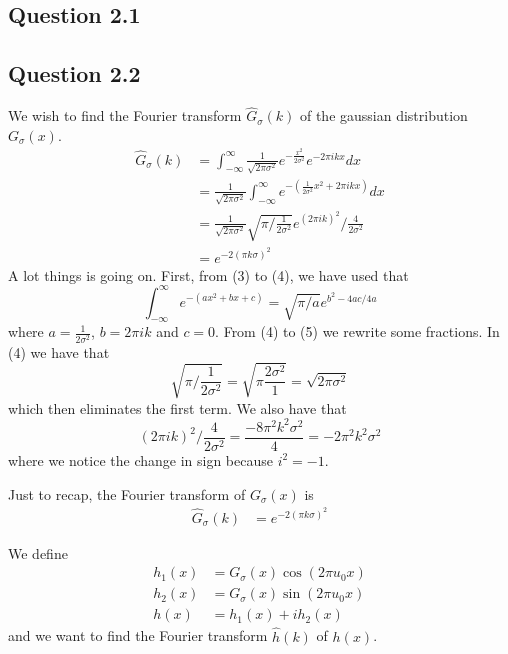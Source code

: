 \documentclass[a4paper, 10pt, final]{article}
\title{\mytitle}
\subtitle{\mysubtitle}
\author{\myauthor{} - \mymail}
\date{\mydate}
\begin{document}
\maketitle

\subsection*{Question 2.1}

\subsection*{Question 2.2}
We wish to find the Fourier transform $\hat{G}_{\sigma}(k)$ of the
gaussian distribution $G_{\sigma}(x)$.
\begin{align}
    \hat{G}_{\sigma}(k) & = \int_{-\infty}^{\infty}{\frac{1}{\sqrt{2\pi \sigma^{2}}}e^{-\frac{x^2}{2\sigma^2}}e^{-2\pi ikx}dx}\\
    & = \frac{1}{\sqrt{2\pi \sigma^{2}}}\int_{-\infty}^{\infty}{e^{-(\frac{1}{2\sigma^2}x^2 + 2\pi ikx)}dx}\\
    & = \frac{1}{\sqrt{2\pi \sigma^{2}}}\sqrt{\pi/\frac{1}{2\sigma^{2}}}e^{(2\pi ik)^2}/\frac{4}{2\sigma^2}\\
    & = e^{-2(\pi k\sigma)^2}
\end{align}
A lot things is going on. First, from (3) to (4), we have used that
\begin{equation}
    \int_{-\infty}^{\infty}e^{-(ax^2+bx+c)} = \sqrt{\pi/a}e^{b^2 - 4ac/4a}
\end{equation}
where $a = \frac{1}{2\sigma^2}$, $b = 2\pi ik$ and $c = 0$. From
(4) to (5) we rewrite some fractions. In (4) we have that
\begin{equation}
    \sqrt{\pi/\frac{1}{2\sigma^{2}}} =
    \sqrt{\pi\frac{2\sigma^2}{1}} = \sqrt{2\pi\sigma^2}
\end{equation}
which then eliminates the first term. We also have that
\begin{equation}
    (2\pi ik)^2 / \frac{4}{2\sigma^2} = \frac{-8\pi^{2}k^{2}\sigma^2}{4} = -2\pi^2 k^2\sigma^2
\end{equation}
where we notice the change in sign because $i^2 = -1$.

Just to recap, the Fourier transform of $G_{\sigma}(x)$ is
\begin{align}
    \hat{G}_{\sigma}(k) & = e^{-2(\pi k\sigma)^2}
\end{align}

We define 
\begin{align}
    h_1(x) & = G_{\sigma}(x)\cos(2\pi u_0x)\\
    h_2(x) & = G_{\sigma}(x)\sin(2\pi u_0x)\\
    h(x) & = h_1(x) + ih_2(x)
\end{align}
and we want to find the Fourier transform $\hat{h}(k)$ of $h(x)$.
\end{document}
